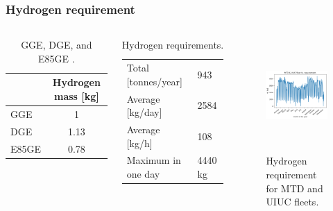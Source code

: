 \begin{frame}
\frametitle{Hydrogen requirement}
\begin{columns}
    \column[t]{5cm}
	\begin{table}[!htb]
		\centering
	    \caption{GGE, DGE, and E85GE \cite{doe_office_of_energy_efficiency_and_renewable_energy_hydrogen_2020} \cite{alternative_fuels_data_center_fuel_2014}.}
		\begin{tabular}{l c}
		\hline
		                 & Hydrogen mass [kg] \\ \hline
		GGE              & 1      \\
		DGE              & 1.13   \\
		E85GE            & 0.78   \\ \hline
        \end{tabular}
	\end{table}

	\begin{table}[!htb]
		\centering
	    \caption{Hydrogen requirements.}
		\begin{tabular}{l|l}
		\hline
		Total [tonnes/year]  & 943      \\
		Average [kg/day] 	 & 2584     \\
		Average [kg/h] 		 & 108      \\
		Maximum in one day   & 4440 kg  \\ \hline
        \end{tabular}
	\end{table}

	\column[t]{5cm}
	\begin{figure}[htbp!]
		\begin{center}
			\includegraphics[height=4.3cm]{images/hydro-fleet}
		\end{center}
		\caption{Hydrogen requirement for MTD and UIUC fleets.}
	\end{figure}
\end{columns}
\end{frame}


